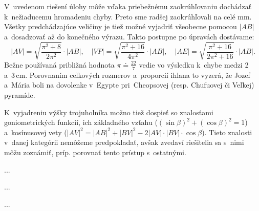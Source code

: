 {V~uvedenom riešení úlohy môže vďaka priebežnému zaokrúhľovaniu dochádzať k~nežiaducemu hromadeniu chyby.
Preto sme radšej zaokrúhľovali na celé mm.
Všetky predchádzajúce veličiny je tiež možné vyjadriť všeobecne pomocou $|AB|$ a~dosadzovať až do konečného výrazu.
Takto postupne po úpravách dostávame:
$$
|AV|=\sqrt{\frac{\pi^2+8}{2\pi^2}}\cdot|AB|, \quad
|VP|=\sqrt{\frac{\pi^2+16}{4\pi^2}}\cdot|AB|, \quad
|AE|=\sqrt{\frac{\pi^2+16}{2\pi^2+16}}\cdot|AB|.
$$
Bežne používaná približná hodnota $\pi\doteq\frac{22}7$ vedie vo výsledku k~chybe medzi 2 a~3\,cm.
Porovnaním celkových rozmerov a~proporcií ihlana to vyzerá, že Jozef a~Mária boli na dovolenke v~Egypte pri~Cheopsovej (resp. Chufuovej či Veľkej) pyramíde.

K~vyjadreniu výšky trojuholníka možno tiež dospieť so znalosťami goniometrických funkcií, ich základného vzťahu ($(\sin\beta)^2+(\cos\beta)^2=1$) a~kosínusovej vety ($|AV|^2=|AB|^2+|BV|^2-2|AV|\cdot|BV|\cdot\cos\beta$).
Tieto znalosti v~danej kategórii nemôžeme predpokladať, avšak zvedaví riešitelia sa s~nimi môžu zoznámiť, príp. porovnať tento prístup s~ostatnými.
}

{%
...}

{%
...}

{%
...}

